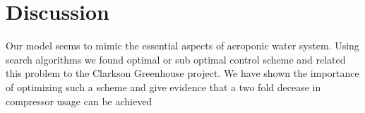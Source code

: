 \documentclass[a4paper,12pt]{article}
\begin{document}
\section{Discussion}
Our model seems to mimic the essential aspects of aeroponic water system. Using search algorithms we found optimal or sub optimal control scheme and related this problem to the Clarkson Greenhouse project. We have shown the importance of optimizing such a scheme and give evidence that a two fold decease in compressor usage can be achieved

{}

\end{document}
